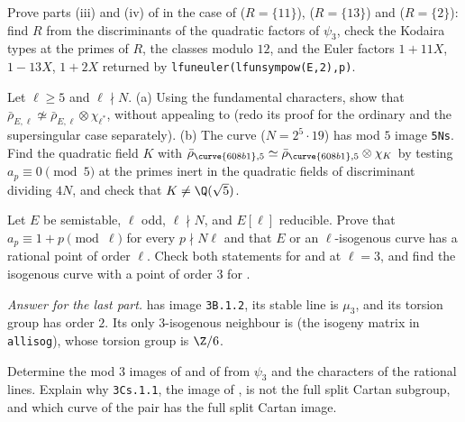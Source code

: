 \begin{exercise}\label{ex:galrep:R-examples}
Prove parts (iii) and (iv) of  in the case of  ($R=\{11\}$),  ($R=\{13\}$) and  ($R=\{2\}$): find $R$
from the discriminants of the quadratic factors of $\psi_3$, check the Kodaira types at the primes of $R$, the classes modulo $12$, and the Euler
factors $1+11X$, $1-13X$, $1+2X$ returned by \texttt{lfuneuler(lfunsympow(E,2),p)}.
\end{exercise}

\begin{exercise}\label{ex:galrep:lstar}
Let $\ell\ge5$ and $\ell\nmid N$. (a) Using the fundamental characters, show that $\bar\rho_{E,\ell}\not\simeq\bar\rho_{E,\ell}\otimes\chi_{\ell^*}$, without appealing to
 (redo its proof for the ordinary and the supersingular case separately). (b) The curve  ($N=2^5\cdot19$) has mod $5$
image \texttt{5Ns}. Find the quadratic field $K$ with $\bar\rho_{\curve{608b1},5}\simeq\bar\rho_{\curve{608b1},5}\otimes\chi_K$ by testing $a_p\equiv0\pmod5$ at the primes inert in the
quadratic fields of discriminant dividing $4N$, and check that $K\ne\Q(\sqrt5)$.
\end{exercise}

\begin{exercise}\label{ex:galrep:eisenstein}
Let $E$ be semistable, $\ell$ odd, $\ell\nmid N$, and $E[\ell]$ reducible. Prove that $a_p\equiv1+p\pmod\ell$ for every $p\nmid N\ell$ and that $E$ or an $\ell$-isogenous curve has a
rational point of order $\ell$. Check both statements for  and  at $\ell=3$, and find the isogenous curve with a point of order $3$ for .

\emph{Answer for the last part.}  has image \texttt{3B.1.2}, its stable line is $\mu_3$, and its torsion group has order $2$. Its only
$3$-isogenous neighbour is  (the isogeny matrix in \texttt{allisog}), whose torsion group is $\Z/6$.
\end{exercise}

\begin{exercise}\label{ex:galrep:3cs11}
Determine the mod $3$ images of  and of  from $\psi_3$ and the characters of the rational lines. Explain why \texttt{3Cs.1.1}, the image of
, is not the full split Cartan subgroup, and which curve of the pair has the full split Cartan image.
\end{exercise}

